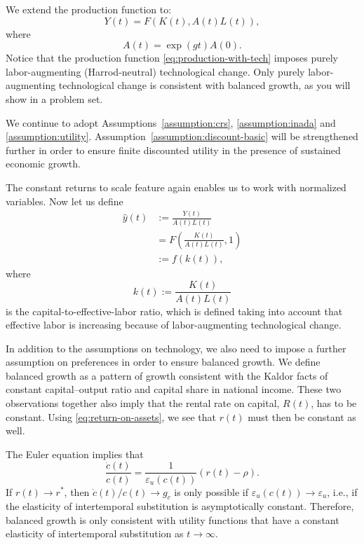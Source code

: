 \documentclass[\topdir/lecture\_notes.tex]{subfiles}
\begin{document}
We extend the production function to:
\begin{equation}
  Y(t)=F(K(t), A(t) L(t)),
  \label{eq:production-with-tech}
\end{equation}
where
\[
  A(t)=\exp(g t) A(0).
\]
Notice that the production function \eqref{eq:production-with-tech} imposes purely labor-augmenting (Harrod-neutral) technological change.
Only purely labor-augmenting technological change is consistent with balanced growth, as you will show in a problem set.

We continue to adopt Assumptions~\ref{assumption:crs}, \ref{assumption:inada} and \ref{assumption:utility}.
Assumption~\ref{assumption:discount-basic} will be strengthened further in order to ensure finite discounted utility in the presence of sustained economic growth.

The constant returns to scale feature again enables us to work with normalized variables.
Now let us define
\[
  \begin{aligned}
    \hat{y}(t) & := \frac{Y(t)}{A(t) L(t)}                \\
               & =F\left(\frac{K(t)}{A(t) L(t)}, 1\right) \\
               & := f(k(t)),
  \end{aligned}
\]
where
\[
  k(t) := \frac{K(t)}{A(t) L(t)}
\]
is the capital-to-effective-labor ratio, which is defined taking into account that effective labor is increasing because of labor-augmenting technological change.

In addition to the assumptions on technology, we also need to impose a further assumption on preferences in order to ensure balanced growth.
We define balanced growth as a pattern of growth consistent with the Kaldor facts of constant capital--output ratio and capital share in national income.
These two observations together also imply that the rental rate on capital, \(R(t)\), has to be constant.
Using \eqref{eq:return-on-assets}, we see that \(r(t)\) must then be constant as well.

The Euler equation implies that
\[
  \frac{\dot{c}(t)}{c(t)}=\frac{1}{\varepsilon_{u}(c(t))}(r(t)-\rho).
\]
If \(r(t) \rightarrow r^{*}\), then \(\dot{c}(t) / c(t) \rightarrow g_{c}\) is only possible if \(\varepsilon_{u}(c(t)) \rightarrow \varepsilon_{u}\), i.e., if the elasticity of intertemporal substitution is asymptotically constant.
Therefore, balanced growth is only consistent with utility functions that have a constant elasticity of intertemporal substitution as \(t \rightarrow \infty\).
\end{document}

